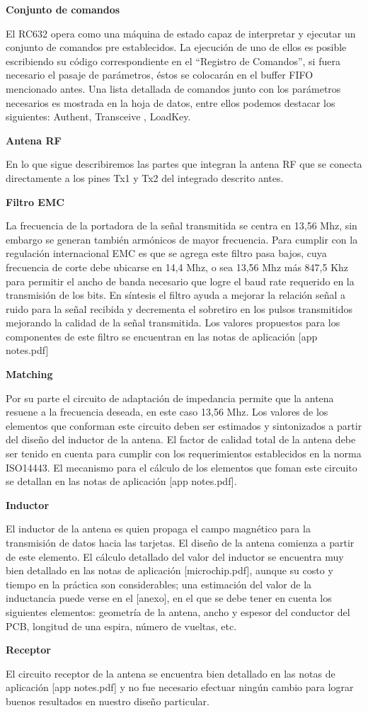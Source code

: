 {\bf{Conjunto de comandos}}

El RC632 opera como una máquina de estado capaz de interpretar y ejecutar un conjunto de comandos pre establecidos. La ejecución de uno de ellos es posible escribiendo su código correspondiente en el “Registro de Comandos”, si fuera necesario el pasaje de parámetros, éstos se colocarán en el buffer FIFO mencionado antes. 
Una lista detallada de comandos junto con los parámetros necesarios es mostrada en la hoja de datos, entre ellos podemos destacar los siguientes: Authent, Transceive , LoadKey.

{\bf{Antena RF}}

En lo que sigue describiremos las partes que integran la antena RF que se conecta directamente a los pines Tx1 y Tx2 del integrado descrito antes.

{\bf{Filtro EMC}}

La frecuencia de la portadora de la señal transmitida se centra en 13,56 Mhz, sin embargo se generan también armónicos de mayor frecuencia. Para cumplir con la regulación internacional EMC es que se agrega este filtro pasa bajos, cuya frecuencia de corte debe ubicarse en 14,4 Mhz, o sea 13,56 Mhz más 847,5 Khz para permitir el ancho de banda necesario que logre el baud rate requerido en la transmisión de los bits. 
En síntesis el filtro ayuda a mejorar la relación señal a ruido para la señal recibida y decrementa el sobretiro en los pulsos transmitidos mejorando la calidad de la señal transmitida.
Los valores propuestos para los componentes de este filtro se encuentran en las notas de aplicación [app notes.pdf]


{\bf{Matching}}

Por su parte el circuito de adaptación de impedancia permite que la antena resuene a la frecuencia deseada, en este caso 13,56 Mhz. Los valores de los elementos que conforman este circuito deben ser estimados y sintonizados a partir del diseño del inductor de la antena.
El factor de calidad total de la antena debe ser tenido en cuenta para cumplir con los requerimientos establecidos en la norma ISO14443. 
El mecanismo para el cálculo de los elementos que foman este circuito se detallan en las notas de aplicación [app notes.pdf].

{\bf{Inductor}}

El inductor de la antena es quien propaga el campo magnético para la transmisión de datos hacia las tarjetas. El diseño de la antena comienza a partir de este elemento.
El cálculo detallado del valor del inductor se encuentra muy bien detallado en las notas de aplicación [microchip.pdf], aunque su costo y tiempo en la práctica son considerables; una estimación del valor de la inductancia puede verse en el [anexo], en el que se debe tener en cuenta los siguientes elementos: geometría de la antena, ancho y espesor del conductor del PCB, longitud de una espira, número de vueltas, etc.

{\bf{Receptor}} 

El circuito receptor de la antena se encuentra bien detallado en las notas de aplicación [app notes.pdf] y no fue necesario efectuar ningún cambio para lograr buenos resultados en nuestro diseño particular. 